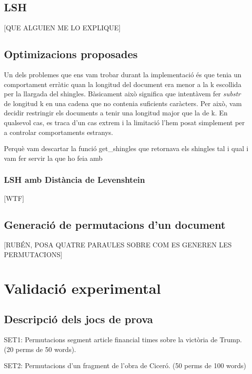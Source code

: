 \documentclass[catalan, 12pt]{report}
\begin{document}
\section{LSH}

[QUE ALGUIEN ME LO EXPLIQUE]

\section{Optimizacions proposades}

Un dels problemes que ens vam trobar durant la implementació és que tenia un comportament erràtic quan la longitud del document era menor a la k escollida per la llargada del shingles. Bàsicament això significa que intentàvem fer \textit{substr} de longitud k en una cadena que no contenia suficients caràcters. Per això, vam decidir restringir els documents a tenir una longitud major que la de k. En qualsevol cas, es traca d'un cas extrem i la limitació l'hem posat simplement per a controlar comportaments estranys.

Perquè vam descartar la funció get\_shingles que retornava els shingles tal i qual i vam fer servir la que ho feia amb

\subsection{LSH amb Distància de Levenshtein}

[WTF]

\section{Generació de permutacions d'un document}

[RUBÉN, POSA QUATRE PARAULES SOBRE COM ES GENEREN  LES PERMUTACIONS]

\chapter{Validació experimental}
\section{Descripció dels jocs de prova}

SET1: Permutacions segment article financial times sobre la victòria de Trump. (20 perms de 50 words). \newline

SET2: Permutacions d'un fragment de l'obra de Ciceró. (50 perms de 100 words) \newline
\end{document}
